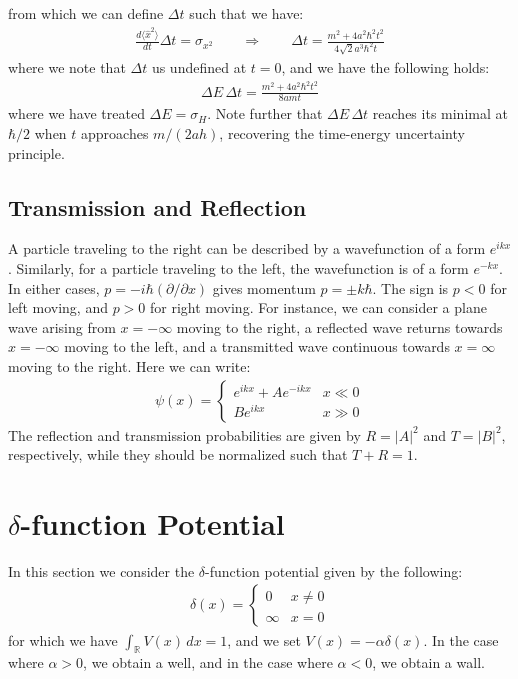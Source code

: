 \documentclass[11pt]{book}
\theoremstyle{break}
\theoremstyle{break}
\newcommand{\R}{\mathbb{R}}
\newcommand{\pd}{\partial}
\begin{document}
from which we can define $\Delta t$ such that we have:
\begin{align*}
\frac{d\langle \hat{x}^2\rangle}{dt}\Delta t = \sigma_{x^2} \qquad \Rightarrow \qquad \Delta t = \frac{m^2 + 4a^2 \hbar^2 t^2}{4\sqrt{2} a^3 \hbar^2 t}
\end{align*}
where we note that $\Delta t$ us undefined at $t = 0$, and we have the following holds:
\begin{align*}
\Delta E\, \Delta t = \frac{m^2 + 4a^2 \hbar^2 t^2}{8am t}
\end{align*}
where we have treated $\Delta E = \sigma_H$. Note further that $\Delta E\, \Delta t$ reaches its minimal at $\hbar/2 $ when $t$ approaches $m/(2ah)$, recovering the time-energy uncertainty principle. 

\subsection{Transmission and Reflection}
A particle traveling to the right can be described by a wavefunction of a form $e^{ikx}$. Similarly, for a particle traveling to the left, the wavefunction is of a form $e^{-kx}$. In either cases, $p = -i\hbar (\pd/\pd x)$ gives momentum $p = \pm k\hbar$. The sign is $p<0$ for left moving, and $p>0$ for right moving. For instance, we can consider a plane wave arising from $x = -\infty$ moving to the right, a reflected wave returns towards $x = -\infty$ moving to the left, and a transmitted wave continuous towards $x  = \infty$ moving to the  right. Here we can write:
\begin{align*}
\psi(x) = \begin{cases}
e^{ikx} + Ae^{-ikx} & x\ll 0 \\
Be^{ikx} & x\gg 0
\end{cases}
\end{align*}
The reflection and transmission probabilities are given by $R = |A|^2$ and $T = |B|^2$, respectively, while they should be normalized such that $T + R = 1$. 


\newpage
\section[$\delta$-function Potential]{\color{red} $\delta$-function Potential\color{black}}
In this section we consider the $\delta$-function potential given by the following:
\begin{align*}
\delta(x) = \begin{cases}
0 & x \neq 0 \\
\infty & x = 0
\end{cases}
\end{align*}
for which we have $\int_\R V(x) \, dx = 1$, and we set $V(x) = -\alpha \delta(x)$. In the case where $\alpha>0$, we obtain a well, and in the case where $\alpha<0$, we obtain a wall.\\
\end{document}
